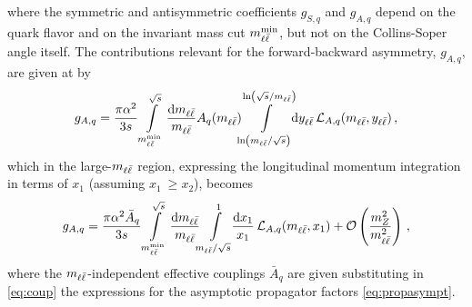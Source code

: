where the symmetric and antisymmetric coefficients $g_{S,q}$ and $g_{A,q}$ depend on the quark flavor
and on the invariant mass cut $m_{\ell\bar{\ell}}^{\text{min}}$, but not on the
Collins-Soper angle itself.
%
The contributions relevant for the forward-backward asymmetry, $g_{A,q}$,
are given at \lo by
\begin{equation}
\label{eq:gAq_integrated_1}
g_{A,q} =\frac{\pi \alpha^2}{3 s} \int\limits_{m_{\ell\bar{\ell}}^{\text{min}}}^{\sqrt s}\frac{\dd m_{\ell\bar{\ell}}}{m_{\ell\bar{\ell}}}A_{q}(m_{\ell\bar{\ell}})\!\!\int\limits_{\ln(m_{\ell\bar{\ell}}/\sqrt s)}^{\ln(\sqrt s/m_{\ell\bar{\ell}})}\!\!\dd y_{\ell\bar{\ell}}\, \mathcal{L}_{A,q}(m_{\ell\bar{\ell}},y_{\ell\bar{\ell}}) \, ,
\end{equation}
which in the large-$m_{\ell\bar{\ell}}$ region,
 expressing the longitudinal momentum integration in terms of
$x_1$ (assuming $x_1~\ge x_2$), becomes
\begin{equation}
  g_{A,q} = \frac{\pi \alpha^2\bar A_q}{3 s} \int\limits_{m_{\ell\bar{\ell}}^{\text{min}}}^{\sqrt s}\frac{\dd m_{\ell\bar{\ell}}}{m_{\ell\bar{\ell}}}
  \!\!\int\limits_{m_{\ell\bar{\ell}}/\sqrt s}^{1}\!\!\frac{\text{d}x_1}{x_1}\, 
  \mathcal{L}_{A,q}(m_{\ell\bar{\ell}},x_1)+\mathcal{O} \left(\frac{m_Z^2}{m_{\ell\bar{\ell}}^2}\right) \, ,
  \label{eq:gAq_integrated}
\end{equation}
where the $m_{\ell\bar{\ell}}$-independent effective couplings $\bar A_q$  are
given substituting in \cref{eq:coup} the expressions for
the asymptotic propagator factors \cref{eq:propasympt}.

